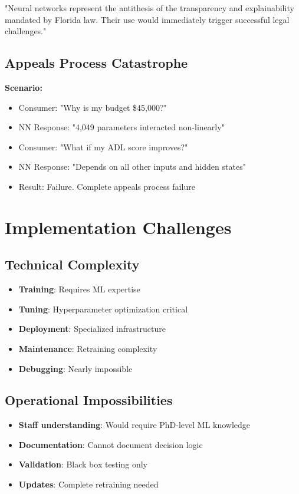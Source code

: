 "Neural networks represent the antithesis of the transparency and explainability mandated by Florida law. Their use would immediately trigger successful legal challenges."

\subsection{Appeals Process Catastrophe}

\textbf{Scenario:}
\begin{itemize}
    \item Consumer: "Why is my budget \$45,000?"
    \item NN Response: "4,049 parameters interacted non-linearly"
    \item Consumer: "What if my ADL score improves?"
    \item NN Response: "Depends on all other inputs and hidden states"
    \item Result: Failure.  Complete appeals process failure
\end{itemize}

\section{Implementation Challenges}

\subsection{Technical Complexity}

\begin{itemize}
    \item \textbf{Training}: Requires ML expertise
    \item \textbf{Tuning}: Hyperparameter optimization critical
    \item \textbf{Deployment}: Specialized infrastructure
    \item \textbf{Maintenance}: Retraining complexity
    \item \textbf{Debugging}: Nearly impossible
\end{itemize}

\subsection{Operational Impossibilities}

\begin{itemize}
    \item \textbf{Staff understanding}: Would require PhD-level ML knowledge
    \item \textbf{Documentation}: Cannot document decision logic
    \item \textbf{Validation}: Black box testing only
    \item \textbf{Updates}: Complete retraining needed
\end{itemize}

